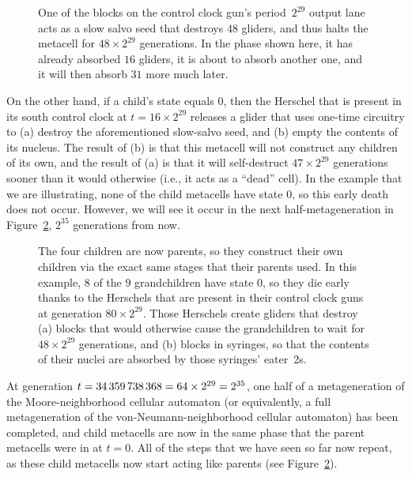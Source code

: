 \begin{figure}[!htb]
	\centering
	\caption{One of the blocks on the control clock gun's period~$2^{29}$ output lane acts as a slow salvo seed that destroys $48$ gliders, and thus halts the metacell for $48 \times 2^{29}$ generations. In the phase shown here, it has already absorbed $16$ gliders, it is about to absorb another one, and it will then absorb $31$ more much later.}
	\label{fig:0e0p_timeline_17179869184}
\end{figure}

On the other hand, if a child's state equals $0$, then the Herschel that is present in its south control clock at $t = 16 \times 2^{29}$ releases a glider that uses one-time circuitry to (a) destroy the aforementioned slow-salvo seed, and (b) empty the contents of its nucleus. The result of (b) is that this metacell will not construct any children of its own, and the result of (a) is that it will self-destruct $47 \times 2^{29}$ generations sooner than it would otherwise (i.e., it acts as a ``dead'' cell). In the example that we are illustrating, none of the child metacells have state $0$, so this early death does not occur. However, we will see it occur in the next half-metageneration in Figure~\ref{fig:0e0p_timeline_34359738368}, $2^{35}$ generations from now.

\begin{figure}[!phtb]
	\centering
	\caption{The four children are now parents, so they construct their own children via the exact same stages that their parents used. In this example, $8$ of the $9$ grandchildren have state $0$, so they die early thanks to the Herschels that are present in their control clock guns at generation $80 \times 2^{29}$. Those Herschels create gliders that destroy (a) blocks that would otherwise cause the grandchildren to wait for $48 \times 2^{29}$ generations, and (b) blocks in syringes, so that the contents of their nuclei are absorbed by those syringes' eater~2s.}
	\label{fig:0e0p_timeline_34359738368}
\end{figure}

At generation $t = 34{\,}359{\,}738{\,}368 = 64 \times 2^{29} = 2^{35}$, one half of a metageneration of the Moore-neighborhood cellular automaton (or equivalently, a full metageneration of the von-Neumann-neighborhood cellular automaton) has been completed, and child metacells are now in the same phase that the parent metacells were in at $t = 0$. All of the steps that we have seen so far now repeat, as these child metacells now start acting like parents (see Figure~\ref{fig:0e0p_timeline_34359738368}).

